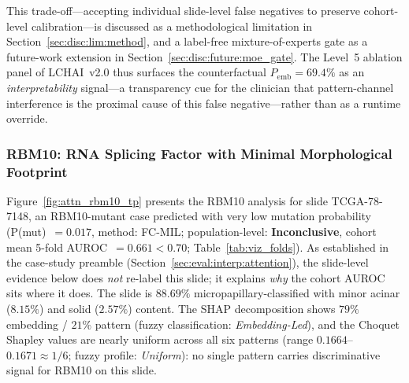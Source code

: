 This trade-off---accepting individual slide-level false
negatives to preserve cohort-level calibration---is discussed
as a methodological limitation in
Section~\ref{sec:disc:lim:method}, and a label-free
mixture-of-experts gate as a future-work extension in
Section~\ref{sec:disc:future:moe_gate}.
The Level~5 ablation panel of LCHAI~v2.0 thus surfaces the
counterfactual $P_{\text{emb}} = 69.4\%$ as an
\emph{interpretability} signal---a transparency cue for the
clinician that pattern-channel interference is the proximal
cause of this false negative---rather than as a runtime override.


\subsubsection{RBM10: RNA Splicing Factor with Minimal Morphological
Footprint}
\label{sec:eval:tcga:rbm10}

Figure~\ref{fig:attn_rbm10_tp} presents the RBM10 analysis for slide
TCGA-78-7148, an RBM10-mutant case predicted with very low mutation
probability (P(mut)~$= 0.017$, method: FC-MIL;
population-level: \textbf{Inconclusive}, cohort mean 5-fold
AUROC~$= 0.661 < 0.70$; Table~\ref{tab:viz_folds}).
As established in the case-study preamble
(Section~\ref{sec:eval:interp:attention}), the slide-level
evidence below does \emph{not} re-label this slide; it explains
\emph{why} the cohort AUROC sits where it does.
The slide is $88.69\%$ micropapillary-classified with minor acinar
($8.15\%$) and solid ($2.57\%$) content.
The SHAP decomposition shows $79\%$ embedding / $21\%$ pattern
(fuzzy classification: \emph{Embedding-Led}), and the Choquet
Shapley values are nearly uniform across all six patterns (range
$0.1664$--$0.1671 \approx 1/6$; fuzzy profile: \emph{Uniform}):
no single pattern carries discriminative signal for RBM10 on this
slide.


